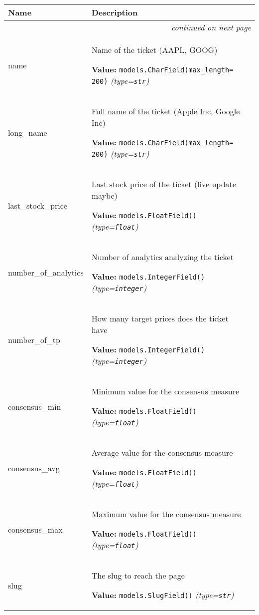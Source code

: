     \vspace{-1cm}
\hspace{\varindent}\begin{longtable}{|p{\varnamewidth}|p{\vardescrwidth}|l}
\cline{1-2}
\cline{1-2} \centering \textbf{Name} & \centering \textbf{Description}& \\
\cline{1-2}
\endhead\cline{1-2}\multicolumn{3}{r}{\small\textit{continued on next page}}\\\endfoot\cline{1-2}
\endlastfoot\raggedright n\-a\-m\-e\- & \raggedright Name of the ticket (AAPL, GOOG)

\textbf{Value:} 
{\tt models.CharField(max\_length= 200)}            {\it (type=\texttt{str})}&\\
\cline{1-2}
\raggedright l\-o\-n\-g\-\_\-n\-a\-m\-e\- & \raggedright Full name of the ticket (Apple Inc, Google Inc)

\textbf{Value:} 
{\tt models.CharField(max\_length= 200)}            {\it (type=\texttt{str})}&\\
\cline{1-2}
\raggedright l\-a\-s\-t\-\_\-s\-t\-o\-c\-k\-\_\-p\-r\-i\-c\-e\- & \raggedright Last stock price of the ticket (live update maybe)

\textbf{Value:} 
{\tt models.FloatField()}            {\it (type=\texttt{float})}&\\
\cline{1-2}
\raggedright n\-u\-m\-b\-e\-r\-\_\-o\-f\-\_\-a\-n\-a\-l\-y\-t\-i\-c\-s\- & \raggedright Number of analytics analyzing the ticket

\textbf{Value:} 
{\tt models.IntegerField()}            {\it (type=\texttt{integer})}&\\
\cline{1-2}
\raggedright n\-u\-m\-b\-e\-r\-\_\-o\-f\-\_\-t\-p\- & \raggedright How many target prices does the ticket have

\textbf{Value:} 
{\tt models.IntegerField()}            {\it (type=\texttt{integer})}&\\
\cline{1-2}
\raggedright c\-o\-n\-s\-e\-n\-s\-u\-s\-\_\-m\-i\-n\- & \raggedright Minimum value for the consensus measure

\textbf{Value:} 
{\tt models.FloatField()}            {\it (type=\texttt{float})}&\\
\cline{1-2}
\raggedright c\-o\-n\-s\-e\-n\-s\-u\-s\-\_\-a\-v\-g\- & \raggedright Average value for the consensus measure

\textbf{Value:} 
{\tt models.FloatField()}            {\it (type=\texttt{float})}&\\
\cline{1-2}
\raggedright c\-o\-n\-s\-e\-n\-s\-u\-s\-\_\-m\-a\-x\- & \raggedright Maximum value for the consensus measure

\textbf{Value:} 
{\tt models.FloatField()}            {\it (type=\texttt{float})}&\\
\cline{1-2}
\raggedright s\-l\-u\-g\- & \raggedright The slug to reach the page

\textbf{Value:} 
{\tt models.SlugField()}            {\it (type=\texttt{str})}&\\
\cline{1-2}
\end{longtable}

